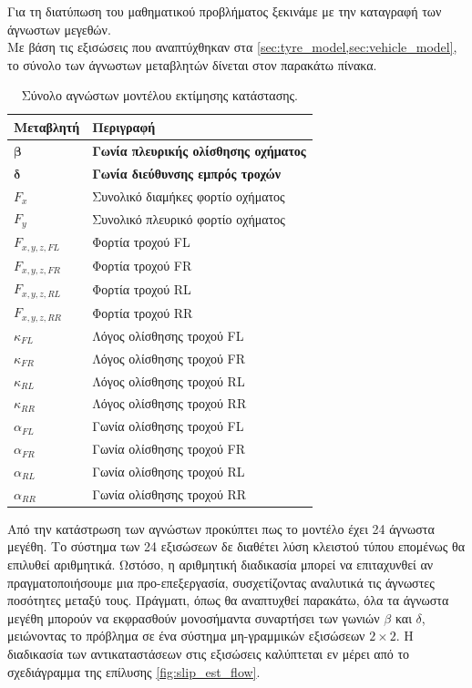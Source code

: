 Για τη διατύπωση του μαθηματικού προβλήματος ξεκινάμε με την καταγραφή των άγνωστων μεγεθών.\\
\noindent
Με βάση τις εξισώσεις που αναπτύχθηκαν στα \cref{sec:tyre_model,sec:vehicle_model}, το σύνολο των άγνωστων μεταβλητών δίνεται στον παρακάτω πίνακα.

\begin{table}[htbp]
    \centering
    \small
    \renewcommand{\arraystretch}{1.2}
    \begin{tabular}{@{}l l@{}}
        \toprule
        \textbf{Μεταβλητή} & \textbf{Περιγραφή} \\
        \midrule
        $\boldsymbol{\beta}$         & \textbf{Γωνία πλευρικής ολίσθησης οχήματος} \\
        $\boldsymbol{\delta}$        & \textbf{Γωνία διεύθυνσης εμπρός τροχών} \\
        \midrule
        $F_x$           & Συνολικό διαμήκες φορτίο οχήματος \\
        $F_y$           & Συνολικό πλευρικό φορτίο οχήματος \\
        \midrule
        $F_{x,y,z,FL}$  & Φορτία τροχού FL \\
        $F_{x,y,z,FR}$  & Φορτία τροχού FR \\
        $F_{x,y,z,RL}$  & Φορτία τροχού RL \\
        $F_{x,y,z,RR}$  & Φορτία τροχού RR \\
        \midrule
        $\kappa_{FL}$   & Λόγος ολίσθησης τροχού FL \\
        $\kappa_{FR}$   & Λόγος ολίσθησης τροχού FR \\
        $\kappa_{RL}$   & Λόγος ολίσθησης τροχού RL \\
        $\kappa_{RR}$   & Λόγος ολίσθησης τροχού RR \\
        \midrule
        $\alpha_{FL}$   & Γωνία ολίσθησης τροχού FL \\
        $\alpha_{FR}$   & Γωνία ολίσθησης τροχού FR \\
        $\alpha_{RL}$   & Γωνία ολίσθησης τροχού RL \\
        $\alpha_{RR}$   & Γωνία ολίσθησης τροχού RR \\
        \bottomrule
    \end{tabular}
    \caption{Σύνολο αγνώστων μοντέλου εκτίμησης κατάστασης.}
    \label{tab:stateUnknowns}
\end{table}

Από την κατάστρωση των αγνώστων προκύπτει πως το μοντέλο έχει 24 άγνωστα μεγέθη. Το σύστημα των 24 εξισώσεων δε διαθέτει λύση κλειστού τύπου επομένως θα επιλυθεί αριθμητικά.
Ωστόσο, η αριθμητική διαδικασία μπορεί να επιταχυνθεί αν πραγματοποιήσουμε μια προ-επεξεργασία, συσχετίζοντας αναλυτικά τις άγνωστες ποσότητες μεταξύ τους. Πράγματι, όπως θα αναπτυχθεί παρακάτω, όλα τα άγνωστα μεγέθη μπορούν να εκφρασθούν μονοσήμαντα συναρτήσει των γωνιών $\beta$ και $\delta$, μειώνοντας το πρόβλημα σε ένα σύστημα μη-γραμμικών εξισώσεων $2\times2$. Η διαδικασία των αντικαταστάσεων στις εξισώσεις καλύπτεται εν μέρει από το σχεδιάγραμμα της επίλυσης \ref{fig:slip_est_flow}. \\[6pt]

